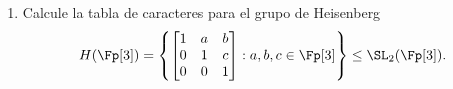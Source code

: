 \documentclass[11pt, reqno]{amsart}
\begin{document}
\begin{enumerate}

		\newex
	\item\label{ex:heisenberg_char_table}
		Calcule la tabla de caracteres para el grupo de Heisenberg
		\[
			H(\Fp[3]) =
			\left\{
				\begin{bmatrix}
					1 & a & b \\
					0 & 1 & c \\
					0 & 0 & 1
				\end{bmatrix} : a, b, c \in \Fp[3]
			\right\} \le \SL_2(\Fp[3]).
		\]


\end{enumerate}
\end{document}
